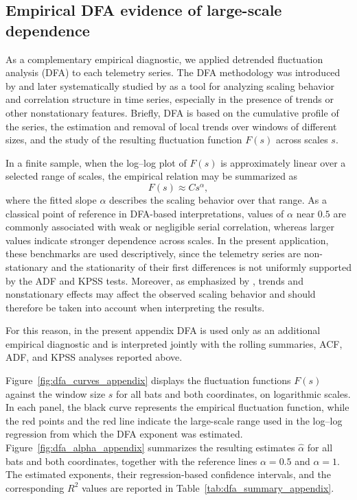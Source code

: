 \documentclass[preprint,12pt,authoryear]{elsarticle}
\begin{document}
\newpage
\subsection{Empirical DFA evidence of large-scale dependence}
\label{appC:DFA}

As a complementary empirical diagnostic, we applied detrended fluctuation
analysis (DFA) to each telemetry series. The DFA methodology was introduced
by \cite{Peng1994} and later systematically studied by
\cite{Kantelhardt2001} as a tool for analyzing scaling behavior and
correlation structure in time series, especially in the presence of trends
or other nonstationary features. Briefly, DFA is based on the cumulative
profile of the series, the estimation and removal of local trends over
windows of different sizes, and the study of the resulting fluctuation
function \(F(s)\) across scales \(s\).

In a finite sample, when the log--log plot of \(F(s)\) is approximately
linear over a selected range of scales, the empirical relation may be
summarized as
\[
F(s)\approx C s^\alpha ,
\]
where the fitted slope \(\alpha\) describes the scaling behavior over that
range. As a classical point of reference in DFA-based interpretations,
values of \(\alpha\) near \(0.5\) are commonly associated with weak or
negligible serial correlation, whereas larger values indicate stronger
dependence across scales. In the present application, these benchmarks are
used descriptively, since the telemetry series are non-stationary and the
stationarity of their first differences is not uniformly supported by the
ADF and KPSS tests. Moreover, as emphasized by \cite{Kantelhardt2001},
trends and nonstationary effects may affect the observed scaling behavior
and should therefore be taken into account when interpreting the results.

For this reason, in the present appendix DFA is used only as an additional
empirical diagnostic and is interpreted jointly with the rolling summaries,
ACF, ADF, and KPSS analyses reported above.

Figure~\ref{fig:dfa_curves_appendix} displays the fluctuation functions
\(F(s)\) against the window size \(s\) for all bats and both coordinates,
on logarithmic scales. In each panel, the black curve represents the
empirical fluctuation function, while the red points and the red line
indicate the large-scale range used in the log--log regression from which
the DFA exponent was estimated. Figure~\ref{fig:dfa_alpha_appendix}
summarizes the resulting estimates \(\widehat\alpha\) for all bats and
both coordinates, together with the reference lines \(\alpha=0.5\) and
\(\alpha=1\). The estimated exponents, their regression-based confidence
intervals, and the corresponding \(R^2\) values are reported in
Table~\ref{tab:dfa_summary_appendix}.
\end{document}
